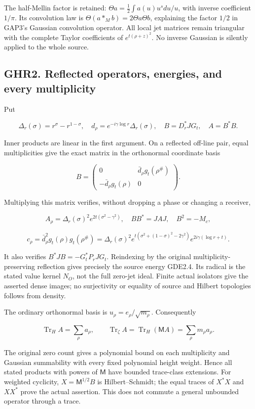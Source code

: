 \documentclass[
]{article}
\begin{document}
The half-Mellin factor is retained: \(\Theta a=\frac12\int a(u)u^sdu/u\), with inverse coefficient \(1/\pi\). Its convolution law is \(\Theta(a*_Mb)=2\Theta a\Theta b\), explaining the factor \(1/2\) in GAP3's Gaussian convolution operator. All local jet matrices remain triangular with the complete Taylor coefficients of \(e^{t(\rho+z)^2}\). No inverse Gaussian is silently applied to the whole source.

\subsection{GHR2. Reflected operators, energies, and every multiplicity}\label{ghr2.-reflected-operators-energies-and-every-multiplicity}

Put

\[
\Delta_r(\sigma)=r^\sigma-r^{1-\sigma},\quad
d_\rho=e^{-i\gamma\log r}\Delta_r(\sigma),\quad
B=D_r^*JG_t,\quad A=B^*B.
\]

Inner products are linear in the first argument. On a reflected off-line pair, equal multiplicities give the exact matrix in the orthonormal coordinate basis

\[
B=\begin{pmatrix}
0&\bar d_\rho g_t(\rho^\#)\\
-\bar d_\rho g_t(\rho)&0
\end{pmatrix}.
\]

Multiplying this matrix verifies, without dropping a phase or changing a receiver,

\[
A_\rho=\Delta_r(\sigma)^2e^{2t(\sigma^2-\gamma^2)},
\quad BB^*=JAJ,
\quad B^2=-M_c,
\]

\[
c_\rho=\bar d_\rho^2g_t(\rho)g_t(\rho^\#)
=\Delta_r(\sigma)^2e^{t(\sigma^2+(1-\sigma)^2-2\gamma^2)}
e^{2i\gamma(\log r+t)}.
\]

It also verifies \(B^*JB=-G_t^*P_rJG_t\). Reindexing by the original multiplicity-preserving reflection gives precisely the source energy GDE2.4. Its radical is the stated value kernel \(N_O\), not the full zero-jet ideal. Finite actual isolators give the asserted dense images; no surjectivity or equality of source and Hilbert topologies follows from density.

The ordinary orthonormal basis is \(u_\rho=e_\rho/\sqrt{m_\rho}\). Consequently

\[
\operatorname{Tr}_H A=\sum_\rho a_\rho,
\qquad
\operatorname{Tr}_\zeta A=\operatorname{Tr}_H(\mathsf M A)
=\sum_\rho m_\rho a_\rho.
\]

The original zero count gives a polynomial bound on each multiplicity and Gaussian summability with every fixed polynomial height weight. Hence all stated products with powers of \(\mathsf M\) have bounded trace-class extensions. For weighted cyclicity, \(X=\mathsf M^{1/2}B\) is Hilbert--Schmidt; the equal traces of \(X^*X\) and \(XX^*\) prove the actual assertion. This does not commute a general unbounded operator through a trace.
\end{document}
